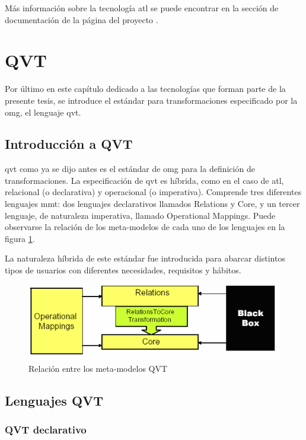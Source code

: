 \documentclass[a4paper,12pt,oneside,spanish]{book}
\begin{document}
Más información sobre la tecnología \gls{atl} se puede encontrar en la sección de documentación de la página del proyecto \cite[\url{www.eclipse.org/atl/}]{ATL}.


\section{QVT}

Por último en este capítulo dedicado a las tecnologías que forman parte de la presente tesis, se introduce el estándar para transformaciones especificado por la \gls{omg}, el lenguaje \gls{qvt}.


\subsection{Introducción a QVT}

\gls{qvt} como ya se dijo antes es el estándar de \gls{omg} para la definición de transformaciones. La especificación de \gls{qvt} es híbrida, como en el caso de \gls{atl}, relacional (o declarativa) y operacional (o imperativa). Comprende tres diferentes lenguajes \gls{mmt}: dos lenguajes declarativos llamados Relations y Core, y un tercer lenguaje, de naturaleza imperativa, llamado Operational Mappings. Puede observarse la relación de los meta-modelos de cada uno de los lenguajes en la figura \ref{QVTmetamodelos}. 

La naturaleza híbrida de este estándar fue introducida para abarcar distintos tipos de usuarios con diferentes necesidades, requisitos y hábitos.


\begin{figure}[hbtp]
\centering
\includegraphics[scale=.65]{./img/metamodelosQVT}
\caption{Relación entre los meta-modelos QVT}
\label{QVTmetamodelos}
\end{figure}


\subsection{Lenguajes QVT}


\subsubsection{QVT declarativo}
\end{document}
